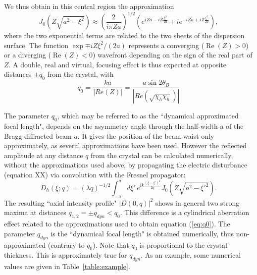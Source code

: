 \documentclass[preprint]{iucr}              %
\newcommand{\inblue}[1]{{\color{blue}#1}}
\newcommand{\inred}[1]{{\color{red}#1}}
\begin{document}
We thus obtain in this central region the approximation
\begin{equation}
\label{eq:approximatedDiffractedField}
    J_0(Z\sqrt{a^2-\xi^2})\approx \left(\frac{2}{i \pi Z a}\right)^{1/2} \left( e^{iZa-i Z\frac{ \xi^2}{2a}} + i 
    e^{-i Z a+i Z\frac{\xi^2}{2a}} \right),
\end{equation}
where the two exponential terms are related to the two sheets of the dispersion surface. 
The function $\exp{\mp i Z \xi^2 / (2 a)}$ %
represents a converging \inblue{($\operatorname{Re}(Z)>0$)} or a diverging \inblue{($\operatorname{Re}(Z)<0$)} wavefront depending on the sign of the real part of $Z$. A double, real and virtual, focusing effect is thus expected at opposite distances $\pm q_0$ from the crystal, with
\begin{equation}
\label{eq:q0}
    q_0 = \frac{k a}{|Re(Z)|}= \frac{a \sin2\theta_B}{|Re(\sqrt{\chi_h\chi_{\bar h}})|}
\end{equation}

The parameter $q_0$, which may be referred to as the ``dynamical \inblue{approximated} focal length", depends on the asymmetry angle \inblue{through} the half-width a of the Bragg-diffracted beam $a$. \inblue{It gives the position of the beam waist only approximately, as several approximations have been used}. However the reflected amplitude at any distance $q$ from the crystal can be calculated numerically, without the approximations used above, \inblue{by propagating the electric disturbance (equation XX)} via convolution with the Fresnel propagator:
\begin{equation}
\label{eq:Dh}
    D_h(\xi; q) = (\lambda q)^{-1/2} \int_{-a}^a d\xi'  \, e^{i k 
    \frac{(\xi-\xi')^2}{2 q}} 
    J_0(Z \sqrt{a^2-\xi'^2}).
\end{equation}
The resulting ``axial intensity profile" $|D(0,q)|^2$ shows in general two strong maxima at distances $q_{1,2}=\pm q_{dyn} < q_0$. This difference is a cylindrical aberration effect related to the approximations used to obtain equation (\ref{eq:q0}). \inblue{The parameter $q_{dyn}$ is the ``dynamical focal length" is obtained numerically, thus non-approximated (contrary to $q_0$)}. Note that $q_0$ is proportional to the crystal thickness. This is \inred{approximately true} for $q_{dyn}$. As an example, some numerical values are given in Table~\ref{table:example}.


\end{document}
